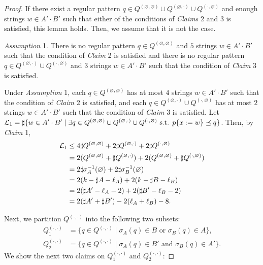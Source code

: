 \begin{proof}
\smallskip

\noindent
If there exist a regular pattern $q \in Q^{(\varnothing,\varnothing)} \cup Q^{(\varnothing,\cdot)} \cup Q^{(\cdot,\varnothing)}$ and enough strings $w \in A'\cdot B'$ such that either of the conditions of \textit{Claims} 2 and 3 is satisfied, this lemma holds. Then, we assume that it is not the case.

\smallskip

\noindent
\textit{Assumption} 1.
There is no regular pattern $q \in Q^{(\varnothing,\varnothing)}$ and $5$ strings $w \in A'\cdot B'$ such that the condition of \textit{Claim} 2 is satisfied and there is no regular pattern $q \in Q^{(\varnothing,\cdot)} \cup Q^{(\cdot,\varnothing)}$ and $3$ strings $w \in A'\cdot B'$ such that the condition of \textit{Claim} 3 is satisfied.

\smallskip

Under \textit{Assumption} 1, each $q\in Q^{(\varnothing,\varnothing)}$ has at most $4$ strings $w \in A'\cdot B'$ such that the condition of \textit{Claim} 2 is satisfied, and each $q \in Q^{(\varnothing,\cdot)} \cup Q^{(\cdot,\varnothing)}$ has at most $2$ strings $w \in A'\cdot B'$ such that the condition of \textit{Claim} 3 is satisfied.
Let ${\cal L}_{1} = \sharp\{w \in A'\cdot B' \mid \exists q \in Q^{(\varnothing,\varnothing)} \cup Q^{(\varnothing,\cdot)} \cup Q^{(\cdot,\varnothing)} \mbox{ s.t. } p\{x:=w\} \preceq q\}$.
Then, by \textit{Claim} 1,
\begin{align*}
  {\cal L}_{1} &\leq 4\sharp Q^{(\varnothing,\varnothing)} + 2\sharp Q^{(\varnothing,\cdot)} + 2\sharp Q^{(\cdot,\varnothing)}\\
  & = 2(Q^{(\varnothing,\varnothing)} + \sharp Q^{(\varnothing,\cdot)}) + 2(Q^{(\varnothing,\varnothing)} + \sharp Q^{(\cdot,\varnothing)})\\
  & = 2\sharp \sigma_{A}^{-1}(\varnothing) + 2\sharp \sigma_{B}^{-1}(\varnothing)\\
  & = 2(k - \sharp A - \ell_{A}) + 2(k - \sharp B - \ell_{B})\\
  & = 2(\sharp A' - \ell_{A} - 2) + 2(\sharp B' - \ell_{B} - 2)\\
  & = 2(\sharp A' + \sharp B') - 2(\ell_{A} + \ell_{B}) - 8.
\end{align*}

Next, we partition $Q^{(\cdot,\cdot)}$ into the following two subsets:
\begin{align*}
  Q_{1}^{(\cdot,\cdot)} & = \{q \in Q^{(\cdot,\cdot)} \mid \sigma_{A}(q) \in B \mbox{ or } \sigma_{B}(q) \in A\},\\
  Q_{2}^{(\cdot,\cdot)} & = \{q \in Q^{(\cdot,\cdot)} \mid \sigma_{A}(q) \in B' \mbox{ and } \sigma_{B}(q) \in A'\}.
\end{align*}
We show the next two claims on $Q_{1}^{(\cdot,\cdot)}$ and $Q_{2}^{(\cdot,\cdot)}$:


\end{proof}
